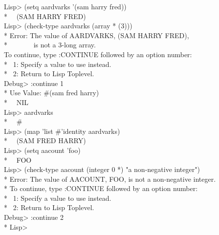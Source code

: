 \begin{defmac}
\begin{lisp}
Lisp> (setq aardvarks '(sam harry fred)) \\*
~\EV\ (SAM HARRY FRED) \\
Lisp> (check-type aardvarks (array * (3))) \\*
Error: The value of AARDVARKS, (SAM HARRY FRED), \\*
~~~~~~~is not a 3-long array. \\
To continue, type :CONTINUE followed by an option number: \\*
~1: Specify a value to use instead. \\*
~2: Return to Lisp Toplevel. \\
Debug> :continue 1 \\*
Use Value: \#(sam fred harry) \\*
~\EV\ NIL \\
Lisp> aardvarks \\*
~\EV\ \#<ARRAY-3 13571> \\
Lisp> (map 'list \#'identity aardvarks) \\*
~\EV\ (SAM FRED HARRY) \\
Lisp> (setq aacount 'foo) \\*
~\EV\ FOO \\
Lisp> (check-type aacount (integer 0 *) "a non-negative integer") \\*
Error: The value of AACOUNT, FOO, is not a non-negative integer. \\*
To continue, type :CONTINUE followed by an option number: \\*
~1: Specify a value to use instead. \\*
~2: Return to Lisp Toplevel. \\
Debug> :continue 2 \\*
Lisp> 
\end{lisp}
\end{defmac}

